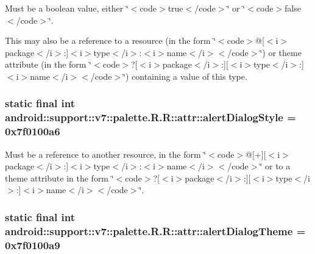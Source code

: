 Must be a boolean value, either \char`\"{}$<$code$>$true$<$/code$>$\char`\"{} or \char`\"{}$<$code$>$false$<$/code$>$\char`\"{}. 

This may also be a reference to a resource (in the form \char`\"{}$<$code$>$@\mbox{[}$<$i$>$package$<$/i$>$:\mbox{]}$<$i$>$type$<$/i$>$:$<$i$>$name$<$/i$>$$<$/code$>$\char`\"{}) or theme attribute (in the form \char`\"{}$<$code$>$?\mbox{[}$<$i$>$package$<$/i$>$:\mbox{]}\mbox{[}$<$i$>$type$<$/i$>$:\mbox{]}$<$i$>$name$<$/i$>$$<$/code$>$\char`\"{}) containing a value of this type. \hypertarget{classandroid_1_1support_1_1v7_1_1palette_1_1_r_1_1attr_d1e5d8f6d5b5fc54897295ba09888ade}{
\subsubsection[{alertDialogStyle}]{\setlength{\rightskip}{0pt plus 5cm}static final int android::support::v7::palette.R.R::attr::alertDialogStyle = 0x7f0100a6}}
\label{classandroid_1_1support_1_1v7_1_1palette_1_1_r_1_1attr_d1e5d8f6d5b5fc54897295ba09888ade}


Must be a reference to another resource, in the form \char`\"{}$<$code$>$@\mbox{[}+\mbox{]}\mbox{[}$<$i$>$package$<$/i$>$:\mbox{]}$<$i$>$type$<$/i$>$:$<$i$>$name$<$/i$>$$<$/code$>$\char`\"{} or to a theme attribute in the form \char`\"{}$<$code$>$?\mbox{[}$<$i$>$package$<$/i$>$:\mbox{]}\mbox{[}$<$i$>$type$<$/i$>$:\mbox{]}$<$i$>$name$<$/i$>$$<$/code$>$\char`\"{}. \hypertarget{classandroid_1_1support_1_1v7_1_1palette_1_1_r_1_1attr_763d19f29ef0fb8465bc02b4c1009305}{
\subsubsection[{alertDialogTheme}]{\setlength{\rightskip}{0pt plus 5cm}static final int android::support::v7::palette.R.R::attr::alertDialogTheme = 0x7f0100a9}}
\label{classandroid_1_1support_1_1v7_1_1palette_1_1_r_1_1attr_763d19f29ef0fb8465bc02b4c1009305}


